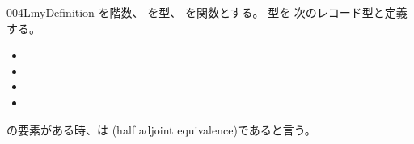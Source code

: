 \documentclass[index]{subfiles}
\begin{document}
\begin{myBlock}{004L}{myDefinition}
  を階数、
  を型、
  を関数とする。
  型を
  次のレコード型と定義する。
  \begin{itemize}
  \item {}
  \item {}
  \item {}
  \item {}
  \end{itemize}
  の要素がある時、は
  (half adjoint equivalence)であると言う。
\end{myBlock}
\end{document}
